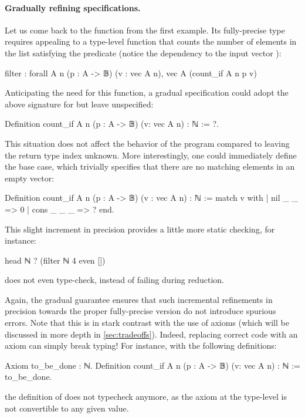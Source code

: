 \paragraph{Gradually refining specifications.}
\label{ex:specif}
  
Let us come back to the  function from the first example.
Its fully-precise type requires appealing to a type-level function that counts the number of
elements in the list satisfying the predicate
(notice the dependency to the input vector ):
\begin{coqcode}
  filter : forall A n (p : A -> 𝔹) (v : vec A n),
            vec A (count_if A n p v)
\end{coqcode}

Anticipating the need for this function, a gradual specification could adopt the above
signature for  but leave  unspecified:
\begin{coqcode}
Definition count_if A n (p : A -> 𝔹) (v: vec A n) : ℕ := ?.
\end{coqcode}

This situation does not affect the behavior of the program compared to leaving the return type index unknown. More interestingly, one could immediately define the base case, which trivially specifies that there are no matching elements in an empty vector:
\begin{coqcode}
Definition count_if A n (p : A -> 𝔹) (v : vec A n) : ℕ :=
  match v with
  | nil _ _ => 0
  | cons _ _ _ => ?
  end.
\end{coqcode}

This slight increment in precision provides a little more static checking, for instance:
\begin{coqcode}
  head ℕ ? (filter ℕ 4 even [])
\end{coqcode}
does not even type-check, instead of failing during reduction.

Again, the gradual guarantee ensures that such incremental refinements in precision towards the proper fully-precise version do not introduce spurious errors.
Note that this is in stark contrast with the use of axioms (which will be discussed in more depth in \cref{sec:tradeoffs}). Indeed, replacing correct code with an axiom can simply break typing! For instance, with the following definitions:
\begin{coqcode}
Axiom to_be_done : ℕ.
Definition count_if A n (p : A -> 𝔹) (v: vec A n) : ℕ :=
  to_be_done.
\end{coqcode}
the definition of  does not typecheck anymore,
as the axiom at the type-level is not convertible to any given value.

